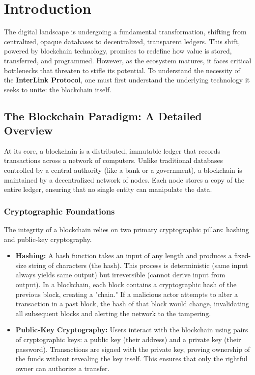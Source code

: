 \documentclass[11pt,a4paper]{article}
\begin{document}
\begin{abstract}
\vspace{0.5in}
\textbf{Keywords:} Zero-Knowledge Proofs, Recursive SNARKs, Atomic Composability, Rust Systems Engineering, Solana Anchor, Liquidity Unification, Hyper-Deflationary Tokenomics, Game-Theoretic Security, Blockchain Interoperability, Decentralized Finance (DeFi).
\end{abstract}

\newpage

\section{Introduction}
\label{sec:intro}

The digital landscape is undergoing a fundamental transformation, shifting from centralized, opaque databases to decentralized, transparent ledgers. This shift, powered by blockchain technology, promises to redefine how value is stored, transferred, and programmed. However, as the ecosystem matures, it faces critical bottlenecks that threaten to stifle its potential. To understand the necessity of the \textbf{InterLink Protocol}, one must first understand the underlying technology it seeks to unite: the blockchain itself.

\subsection{The Blockchain Paradigm: A Detailed Overview}
At its core, a blockchain is a distributed, immutable ledger that records transactions across a network of computers. Unlike traditional databases controlled by a central authority (like a bank or a government), a blockchain is maintained by a decentralized network of nodes. Each node stores a copy of the entire ledger, ensuring that no single entity can manipulate the data.

\subsubsection{Cryptographic Foundations}
The integrity of a blockchain relies on two primary cryptographic pillars: hashing and public-key cryptography. 
\begin{itemize}
    \item \textbf{Hashing:} A hash function takes an input of any length and produces a fixed-size string of characters (the hash). This process is deterministic (same input always yields same output) but irreversible (cannot derive input from output). In a blockchain, each block contains a cryptographic hash of the previous block, creating a "chain." If a malicious actor attempts to alter a transaction in a past block, the hash of that block would change, invalidating all subsequent blocks and alerting the network to the tampering.
    \item \textbf{Public-Key Cryptography:} Users interact with the blockchain using pairs of cryptographic keys: a public key (their address) and a private key (their password). Transactions are signed with the private key, proving ownership of the funds without revealing the key itself. This ensures that only the rightful owner can authorize a transfer.
\end{itemize}
\end{document}
